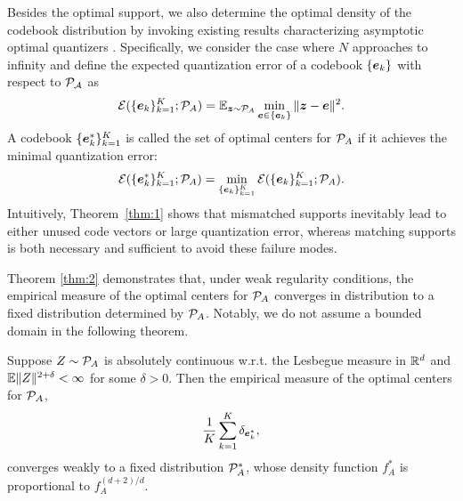 Besides the optimal support, we also determine the optimal density of the codebook distribution by invoking existing results characterizing asymptotic optimal quantizers \cite{graf2000foundations}. Specifically, we consider the case where $N$ approaches to infinity and define the expected quantization error of a codebook $\{\bm{e}_k\}$ with respect to $\mathcal{P}_{\mathcal{A}}$ as 
\begin{align}
\mathcal{E}(\{\bm{e}_k\}_{k=1}^K;\mathcal{P}_A)=\mathbb{E}_{\bm{z}\sim\mathcal{P}_A}\min_{\bm{e}\in\{\bm{e}_k\}}\| \bm{z}-\bm{e}\|^2.
\end{align}
A codebook $\{\bm{e}^*_k\}_{k=1}^K$ is called the set of optimal centers for $\mathcal{P}_A$ if it achieves the minimal quantization error:
\begin{align}
\mathcal{E}(\{\bm{e}^*_k\}_{k=1}^K;\mathcal{P}_A)=\min_{\{\bm{e}_k\}_{k=1}^K}\mathcal{E}(\{\bm{e}_k\}_{k=1}^K;\mathcal{P}_A).
\end{align}
Intuitively, Theorem~\ref{thm:1} shows that mismatched supports inevitably lead to either unused code vectors or large quantization error, whereas matching supports is both necessary and sufficient to avoid these failure modes.

Theorem \ref{thm:2} demonstrates that,  under weak regularity conditions,  the empirical measure of the optimal centers for $\mathcal{P}_A$ converges in distribution to a fixed distribution determined by $\mathcal{P}_A$. Notably, we do not assume a bounded domain in the following theorem.


\begin{theorem}\label{thm:2} 
Suppose $Z\sim\mathcal{P}_A$ is absolutely continuous w.r.t. the Lesbegue measure in $\mathbb{R}^d$ and $\mathbb{E}\| Z\|^{2+\delta}<\infty$ for some $\delta>0$.
Then the empirical measure of the optimal centers for $\mathcal{P}_A$, 
\begin{align}
\frac{1}{K}\sum_{k=1}^K\delta_{\bm{e}^*_k},
\end{align}
converges weakly to a fixed distribution $\mathcal{P}_A^*$, whose density function $f_A^*$ is proportional to $f_A^{(d+2)/d}$. 
\end{theorem}


 

